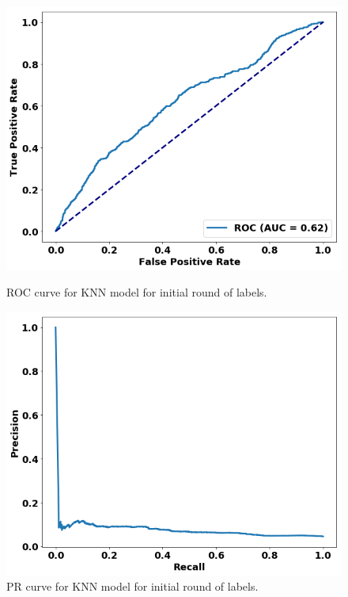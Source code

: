 \begin{figure}
\centering
\begin{minipage}[b]{.4\textwidth}
\includegraphics[trim=0in 0.1in 0.1in 0.in,clip,width=1.0\textwidth]{figures/roc_init.png}
\caption{ROC curve for KNN model for initial round of labels.}\label{fig:roc_init}
\end{minipage}\qquad
\begin{minipage}[b]{.4\textwidth}
\includegraphics[trim=0in 0.1in 0.1in 0.in,clip,width=1.0\textwidth]{figures/prc_init.png}
\caption{PR curve for KNN model for initial round of labels.}\label{fig:prc_init}
\end{minipage}


\end{figure}
